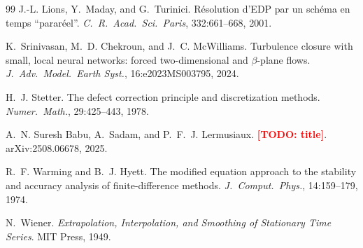 \documentclass[11pt]{article}
\theoremstyle{plain}
\theoremstyle{definition}
\newcommand{\TODO}[1]{\textcolor{red}{\textbf{[TODO: #1]}}}
\begin{document}
\begin{thebibliography}{99}
J.-L. Lions, Y.~Maday, and G.~Turinici. R\'esolution d'EDP par un sch\'ema en
temps ``parar\'eel''. \emph{C.\ R.\ Acad.\ Sci.\ Paris}, 332:661--668, 2001.

K.~Srinivasan, M.~D. Chekroun, and J.~C. McWilliams. Turbulence closure with
small, local neural networks: forced two-dimensional and $\beta$-plane flows.
\emph{J.\ Adv.\ Model.\ Earth Syst.}, 16:e2023MS003795, 2024.

H.~J. Stetter. The defect correction principle and discretization methods.
\emph{Numer.\ Math.}, 29:425--443, 1978.

A.~N. Suresh Babu, A.~Sadam, and P.~F.~J. Lermusiaux. \TODO{title}.
arXiv:2508.06678, 2025.

R.~F. Warming and B.~J. Hyett. The modified equation approach to the
stability and accuracy analysis of finite-difference methods. \emph{J.\
Comput.\ Phys.}, 14:159--179, 1974.

N.~Wiener. \emph{Extrapolation, Interpolation, and Smoothing of Stationary
Time Series}. MIT Press, 1949.

\end{thebibliography}
\end{document}
